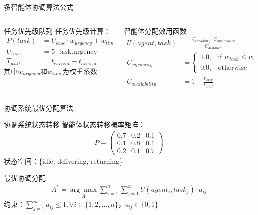 \documentclass[
10pt,
aspectratio=169,
]{beamer}
\begin{document}
\begin{frame}{多智能体协调算法公式}
    \begin{columns}
        \begin{column}{0.5\textwidth}
            \begin{exampleblock}{任务优先级队列}
                任务优先级计算：
                \begin{align}
                P(task) &= U_{base} \cdot w_{urgency} + w_{time} \cdot T_{wait} \\
                U_{base} &= 5 \cdot \text{task.urgency} \\
                T_{wait} &= t_{current} - t_{arrival}
                \end{align}
                其中$w_{urgency}$和$w_{time}$为权重系数
            \end{exampleblock}
        \end{column}
        \begin{column}{0.5\textwidth}
            \begin{alertblock}{智能体分配效用函数}
                \begin{align}
                U(agent, task) &= \frac{C_{capability} \cdot C_{availability}}{C_{distance}} \\
                C_{capability} &= 
                \begin{cases}
                1.0, & \text{if } w_{task} \leq w_{agent.max} \\
                0.0, & \text{otherwise}
                \end{cases} \\
                C_{availability} &= 1 - \frac{t_{busy}}{t_{total}}
                \end{align}
            \end{alertblock}
        \end{column}
    \end{columns}
\end{frame}

\begin{frame}{协调系统最优分配算法}
    \begin{block}{协调系统状态转移}
        智能体状态转移概率矩阵：
        \begin{align}
        P = \begin{pmatrix}
        0.7 & 0.2 & 0.1 \\
        0.1 & 0.8 & 0.1 \\
        0.2 & 0.1 & 0.7
        \end{pmatrix}
        \end{align}
        状态空间：\{idle, delivering, returning\}
    \end{block}
    
    \begin{alertblock}{最优协调分配}
        \begin{align}
        A^* = \underset{A}{\arg\max} \sum_{i=1}^{n} \sum_{j=1}^{m} U(agent_i, task_j) \cdot a_{ij}
        \end{align}
        约束：$\sum_{j=1}^{m} a_{ij} \leq 1, \forall i \in \{1,2,...,n\}$，$a_{ij} \in \{0,1\}$
    \end{alertblock}
\end{frame}
\end{document}
